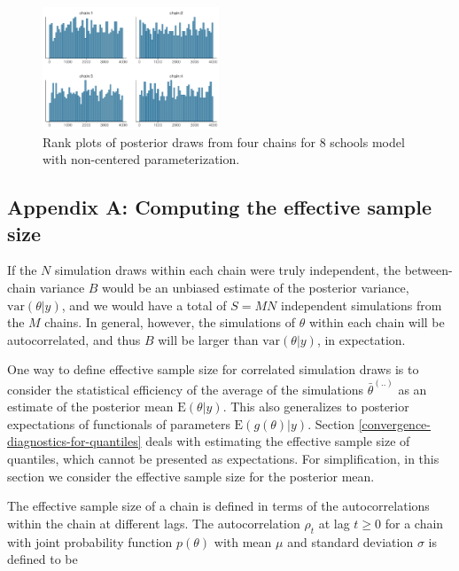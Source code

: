 \documentclass[american,]{article}
\theoremstyle{definition}
\begin{document}
\begin{figure}[tp]
  \centering
  \includegraphics[width=0.47\textwidth]{graphics/hist-fit-ncp2-1.pdf}
  \caption{Rank plots of posterior draws from four chains for 8 schools model with non-centered parameterization.}
  \label{fig:hist-fit-ncp2-1}
\end{figure}


\hypertarget{refs}{}



\newpage
\hypertarget{ESS}{%
\subsection*{Appendix A: Computing the effective sample size}\label{ESS}}

If the \(N\) simulation draws within each chain were truly independent,
the between-chain variance \(B\) would be an unbiased estimate of the
posterior variance, \(\mbox{var}(\theta | y)\), and we would have a
total of \(S = MN\) independent simulations from the \(M\) chains. In
general, however, the simulations of \(\theta\) within each chain will
be autocorrelated, and thus \(B\) will be larger than
\(\mbox{var}(\theta | y)\), in expectation.

One way to define effective sample size for correlated simulation draws
is to consider the statistical efficiency of the average of the
simulations \(\bar{\theta}^{(..)}\) as an estimate of the posterior mean
\(\mbox{E}(\theta | y)\). This also generalizes to posterior
expectations of functionals of parameters \(\mbox{E}(g(\theta) | y)\).
Section \ref{convergence-diagnostics-for-quantiles} deals with 
estimating the effective sample size of
quantiles, which cannot be presented as expectations. For simplification,
in this section we consider the effective sample size for the posterior
mean.

The effective sample size of a chain is defined in terms of the
autocorrelations within the chain at different lags. The autocorrelation
\(\rho_t\) at lag \(t \geq 0\) for a chain with joint probability
function \(p(\theta)\) with mean \(\mu\) and standard deviation \(\sigma\) is
defined to be
\end{document}
